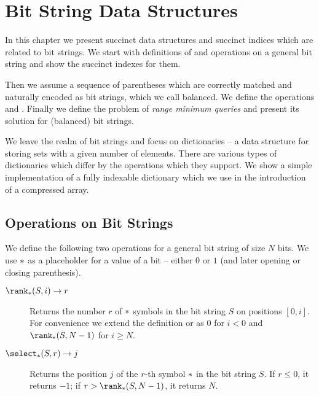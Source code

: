 \chapter{Bit String Data Structures}\label{c:bit-strings}

In this chapter we present succinct data structures and succinct indices which are related to bit strings.
We start with definitions of \rank{} and \select{} operations on a general bit string and show the succinct indexes for them.

Then we assume a sequence of parentheses which are correctly matched and naturally encoded as bit strings, which we call balanced.
We define the operations \match{} and \enclose{}.
Finally we define the problem of \emph{range minimum queries} and present its solution for (balanced) bit strings.

We leave the realm of bit strings and focus on dictionaries -- a data structure for storing sets with a given number of elements.
There are various types of dictionaries which differ by the operations which they support.
We show a simple implementation of a fully indexable dictionary which we use in the introduction of a compressed array.

\section{Operations on Bit Strings}\label{s:op-bs}

We define the following two operations for a general bit string of size $N$ bits.
We use $\ph$ as a placeholder for a value of a bit -- either $0$ or $1$ (and later opening or closing parenthesis).
\begin{description}
	\item[$\rank_{\ph}(S, i) \rightarrow r$]
	Returns the number $r$ of $\ph$ symbols in the bit string $S$ on positions $[0, i]$.
	For convenience we extend the definition or \rank{} as $0$ for $i < 0$ and $\rank_{\ph}(S, N - 1)$ for $i \ge N$.

	\item[$\select_{\ph}(S, r) \rightarrow j$]
	Returns the position $j$ of the $r$-th symbol $\ph$ in the bit string $S$.
	If $r \le 0$, it returns $-1$; if $r > \rank_{\ph}(S, N - 1)$, it returns $N$.
\end{description}

